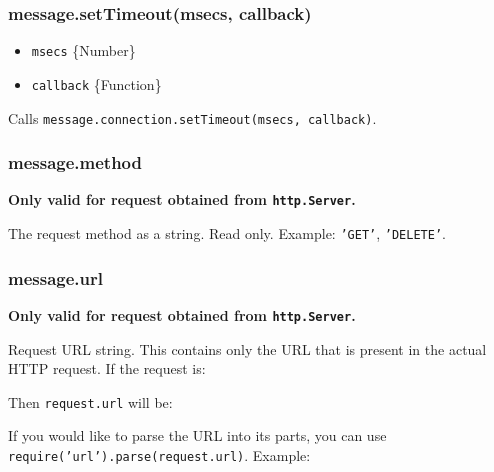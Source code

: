 \subsubsection{message.setTimeout(msecs, callback)}

\begin{itemize}
\item
  \texttt{msecs} \{Number\}
\item
  \texttt{callback} \{Function\}
\end{itemize}

Calls \texttt{message.connection.setTimeout(msecs, callback)}.

\subsubsection{message.method}

\textbf{Only valid for request obtained from \texttt{http.Server}.}

The request method as a string. Read only. Example: \texttt{'GET'},
\texttt{'DELETE'}.

\subsubsection{message.url}

\textbf{Only valid for request obtained from \texttt{http.Server}.}

Request URL string. This contains only the URL that is present in the
actual HTTP request. If the request is:

\begin{Shaded}
\begin{Highlighting}[]
\end{Highlighting}
\end{Shaded}

Then \texttt{request.url} will be:

\begin{Shaded}
\begin{Highlighting}[]
\end{Highlighting}
\end{Shaded}

If you would like to parse the URL into its parts, you can use
\texttt{require('url').parse(request.url)}. Example:

